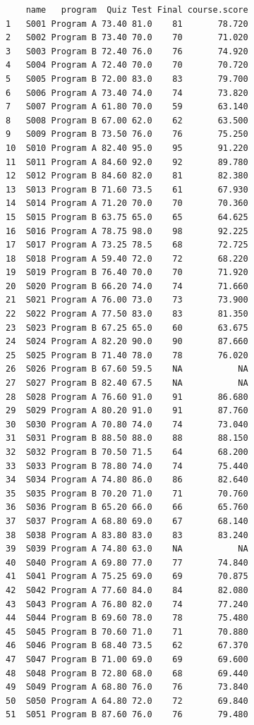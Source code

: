 \documentclass[
  letterpaper,
  DIV=11,
  numbers=noendperiod]{scrreprt}
\begin{document}
\begin{verbatim}
    name   program  Quiz Test Final course.score
1   S001 Program A 73.40 81.0    81       78.720
2   S002 Program B 73.40 70.0    70       71.020
3   S003 Program B 72.40 76.0    76       74.920
4   S004 Program A 72.40 70.0    70       70.720
5   S005 Program B 72.00 83.0    83       79.700
6   S006 Program A 73.40 74.0    74       73.820
7   S007 Program A 61.80 70.0    59       63.140
8   S008 Program B 67.00 62.0    62       63.500
9   S009 Program B 73.50 76.0    76       75.250
10  S010 Program A 82.40 95.0    95       91.220
11  S011 Program A 84.60 92.0    92       89.780
12  S012 Program B 84.60 82.0    81       82.380
13  S013 Program B 71.60 73.5    61       67.930
14  S014 Program A 71.20 70.0    70       70.360
15  S015 Program B 63.75 65.0    65       64.625
16  S016 Program A 78.75 98.0    98       92.225
17  S017 Program A 73.25 78.5    68       72.725
18  S018 Program A 59.40 72.0    72       68.220
19  S019 Program B 76.40 70.0    70       71.920
20  S020 Program B 66.20 74.0    74       71.660
21  S021 Program A 76.00 73.0    73       73.900
22  S022 Program A 77.50 83.0    83       81.350
23  S023 Program B 67.25 65.0    60       63.675
24  S024 Program A 82.20 90.0    90       87.660
25  S025 Program B 71.40 78.0    78       76.020
26  S026 Program B 67.60 59.5    NA           NA
27  S027 Program B 82.40 67.5    NA           NA
28  S028 Program A 76.60 91.0    91       86.680
29  S029 Program A 80.20 91.0    91       87.760
30  S030 Program A 70.80 74.0    74       73.040
31  S031 Program B 88.50 88.0    88       88.150
32  S032 Program B 70.50 71.5    64       68.200
33  S033 Program B 78.80 74.0    74       75.440
34  S034 Program A 74.80 86.0    86       82.640
35  S035 Program B 70.20 71.0    71       70.760
36  S036 Program B 65.20 66.0    66       65.760
37  S037 Program A 68.80 69.0    67       68.140
38  S038 Program A 83.80 83.0    83       83.240
39  S039 Program A 74.80 63.0    NA           NA
40  S040 Program A 69.80 77.0    77       74.840
41  S041 Program A 75.25 69.0    69       70.875
42  S042 Program A 77.60 84.0    84       82.080
43  S043 Program A 76.80 82.0    74       77.240
44  S044 Program B 69.60 78.0    78       75.480
45  S045 Program B 70.60 71.0    71       70.880
46  S046 Program B 68.40 73.5    62       67.370
47  S047 Program B 71.00 69.0    69       69.600
48  S048 Program B 72.80 68.0    68       69.440
49  S049 Program A 68.80 76.0    76       73.840
50  S050 Program A 64.80 72.0    72       69.840
51  S051 Program B 87.60 76.0    76       79.480

\end{verbatim}
\end{document}
